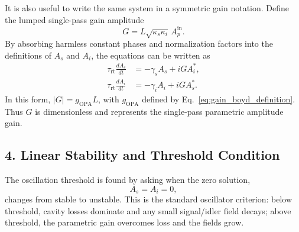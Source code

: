 \begin{resolucao}[Solution]
    It is also useful to write the same system in a symmetric gain notation. Define the lumped single-pass gain amplitude
    \begin{equation}
        G
        =
        L\sqrt{\kappa_s\kappa_i}\,
        A_p^{\mathrm{in}}.
        \label{eq:lumped_G_definition}
    \end{equation}
    By absorbing harmless constant phases and normalization factors into the definitions of $A_s$ and $A_i$, the equations can be written as
    \begin{align}
        \tau_{\mathrm{rt}}
        \frac{dA_s}{dt}
        &=
        -\gamma_sA_s
        +
        iG A_i^*,
        \label{eq:dro_dyn_s}
        \\
        \tau_{\mathrm{rt}}
        \frac{dA_i}{dt}
        &=
        -\gamma_iA_i
        +
        iG A_s^*.
        \label{eq:dro_dyn_i}
    \end{align}
    In this form, $|G|=g_{\mathrm{OPA}}L$, with $g_{\mathrm{OPA}}$ defined by Eq.~\eqref{eq:gain_boyd_definition}. Thus $G$ is dimensionless and represents the single-pass parametric amplitude gain.

\subsection*{4. Linear Stability and Threshold Condition}

    The oscillation threshold is found by asking when the zero solution,
    \[
        A_s=A_i=0,
    \]
    changes from stable to unstable. This is the standard oscillator criterion: below threshold, cavity losses dominate and any small signal/idler field decays; above threshold, the parametric gain overcomes loss and the fields grow.


\end{resolucao}
